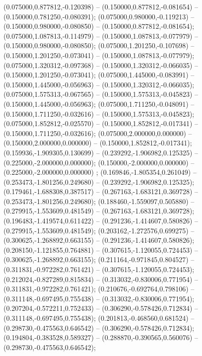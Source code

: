 (0.075000,0.877812,-0.120398) -- (0.150000,0.877812,-0.081654) -- (0.150000,0.781250,-0.080391);
 (0.075000,0.980000,-0.119213) -- (0.150000,0.980000,-0.080850) -- (0.150000,0.877812,-0.081654);
 (0.075000,1.087813,-0.114979) -- (0.150000,1.087813,-0.077979) -- (0.150000,0.980000,-0.080850);
 (0.075000,1.201250,-0.107698) -- (0.150000,1.201250,-0.073041) -- (0.150000,1.087813,-0.077979);
 (0.075000,1.320312,-0.097368) -- (0.150000,1.320312,-0.066035) -- (0.150000,1.201250,-0.073041);
 (0.075000,1.445000,-0.083991) -- (0.150000,1.445000,-0.056963) -- (0.150000,1.320312,-0.066035);
 (0.075000,1.575313,-0.067565) -- (0.150000,1.575313,-0.045823) -- (0.150000,1.445000,-0.056963);
 (0.075000,1.711250,-0.048091) -- (0.150000,1.711250,-0.032616) -- (0.150000,1.575313,-0.045823);
 (0.075000,1.852812,-0.025570) -- (0.150000,1.852812,-0.017341) -- (0.150000,1.711250,-0.032616);
 (0.075000,2.000000,0.000000) -- (0.150000,2.000000,0.000000) -- (0.150000,1.852812,-0.017341);
 (0.159936,-1.909305,0.130699) -- (0.239292,-1.906982,0.125325) -- (0.225000,-2.000000,0.000000);
 (0.150000,-2.000000,0.000000) -- (0.225000,-2.000000,0.000000) ;
 (0.169846,-1.805354,0.261049) -- (0.253473,-1.801256,0.249680) -- (0.239292,-1.906982,0.125325);
 (0.179461,-1.688308,0.387517) -- (0.267163,-1.683121,0.369728) -- (0.253473,-1.801256,0.249680);
 (0.188460,-1.559097,0.505880) -- (0.279915,-1.553609,0.481549) -- (0.267163,-1.683121,0.369728);
 (0.196483,-1.419574,0.611422) -- (0.291236,-1.414607,0.580826) -- (0.279915,-1.553609,0.481549);
 (0.203162,-1.272576,0.699275) -- (0.300625,-1.268892,0.663155) -- (0.291236,-1.414607,0.580826);
 (0.208150,-1.121855,0.764881) -- (0.307615,-1.120055,0.724453) -- (0.300625,-1.268892,0.663155);
 (0.211164,-0.971845,0.804527) -- (0.311831,-0.972282,0.761421) -- (0.307615,-1.120055,0.724453);
 (0.212024,-0.827289,0.815834) -- (0.313032,-0.830006,0.771954) -- (0.311831,-0.972282,0.761421);
 (0.210676,-0.692764,0.798106) -- (0.311148,-0.697495,0.755438) -- (0.313032,-0.830006,0.771954);
 (0.207204,-0.572211,0.752433) -- (0.306290,-0.578426,0.712834) -- (0.311148,-0.697495,0.755438);
 (0.201813,-0.468560,0.681524) -- (0.298730,-0.475563,0.646542) -- (0.306290,-0.578426,0.712834);
 (0.194804,-0.383528,0.589327) -- (0.288870,-0.390565,0.560076) -- (0.298730,-0.475563,0.646542);
